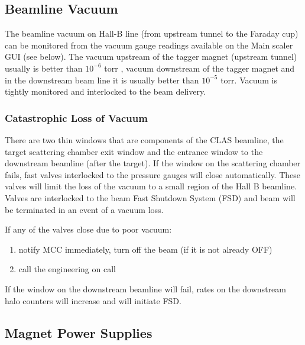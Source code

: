 \documentclass[12pt]{article}
\begin{document}
\subsection{Beamline Vacuum}
\indent

The beamline vacuum on Hall-B line (from upstream tunnel to the Faraday cup) can be monitored from the vacuum gauge readings available on the Main scaler GUI (see below). The vacuum upstream of the tagger magnet (upstream tunnel) usually is better than \( 10^{-6} \) torr , vacuum  downstream of the tagger magnet and in the downstream beam line it is usually better than \( 10^{-5} \) torr. Vacuum is tightly monitored and interlocked to the beam delivery. 


\subsubsection{Catastrophic Loss of Vacuum}
\indent

There are two thin windows that are components of the CLAS beamline, the target scattering chamber exit window
and the entrance window to the downstream beamline (after the target). If the window on the scattering chamber fails, fast valves interlocked to the pressure gauges will close automatically. These valves will limit the loss of the vacuum to a small region of the Hall B beamline. Valves are interlocked to the beam Fast Shutdown System (FSD) and beam will be terminated in an event of a vacuum loss.

If any of the valves close due to poor vacuum: 

\begin{enumerate}
\item notify MCC immediately, turn off the beam (if it is not already OFF)
\item call the engineering on call 
\end{enumerate}

If the window on the downstream beamline will fail, rates on the downstream halo counters will increase and will initiate FSD. 

\subsection{Magnet Power Supplies}
\indent
\end{document}
